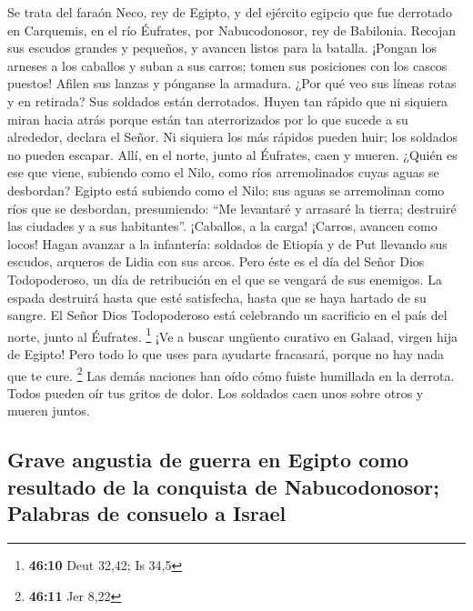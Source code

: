  Se trata del faraón Neco, rey de Egipto, y del ejército
egipcio que fue derrotado en Carquemis, en el río Éufrates, por
Nabucodonosor, rey de Babilonia.  Recojan sus escudos
grandes y pequeños, y avancen listos para la batalla. 
¡Pongan los arneses a los caballos y suban a sus carros; tomen sus
posiciones con los cascos puestos! Afilen sus lanzas y pónganse la
armadura.  ¿Por qué veo sus líneas rotas y en retirada?
Sus soldados están derrotados. Huyen tan rápido que ni siquiera miran
hacia atrás porque están tan aterrorizados por lo que sucede a su
alrededor, declara el Señor.  Ni siquiera los más rápidos
pueden huir; los soldados no pueden escapar. Allí, en el norte, junto al
Éufrates, caen y mueren.  ¿Quién es ese que viene,
subiendo como el Nilo, como ríos arremolinados cuyas aguas se desbordan?
 Egipto está subiendo como el Nilo; sus aguas se
arremolinan como ríos que se desbordan, presumiendo: ``Me levantaré y
arrasaré la tierra; destruiré las ciudades y a sus habitantes''.
 ¡Caballos, a la carga! ¡Carros, avancen como locos! Hagan
avanzar a la infantería: soldados de Etiopía y de Put llevando sus
escudos, arqueros de Lidia con sus arcos.  Pero éste es
el día del Señor Dios Todopoderoso, un día de retribución en el que se
vengará de sus enemigos. La espada destruirá hasta que esté satisfecha,
hasta que se haya hartado de su sangre. El Señor Dios Todopoderoso está
celebrando un sacrificio en el país del norte, junto al Éufrates.
\footnote{\textbf{46:10} Deut 32,42; Is 34,5}  ¡Ve a
buscar ungüento curativo en Galaad, virgen hija de Egipto! Pero todo lo
que uses para ayudarte fracasará, porque no hay nada que te cure.
\footnote{\textbf{46:11} Jer 8,22}  Las demás naciones
han oído cómo fuiste humillada en la derrota. Todos pueden oír tus
gritos de dolor. Los soldados caen unos sobre otros y mueren juntos.

\hypertarget{grave-angustia-de-guerra-en-egipto-como-resultado-de-la-conquista-de-nabucodonosor-palabras-de-consuelo-a-israel}{%
\subsection{Grave angustia de guerra en Egipto como resultado de la
conquista de Nabucodonosor; Palabras de consuelo a
Israel}\label{grave-angustia-de-guerra-en-egipto-como-resultado-de-la-conquista-de-nabucodonosor-palabras-de-consuelo-a-israel}}

